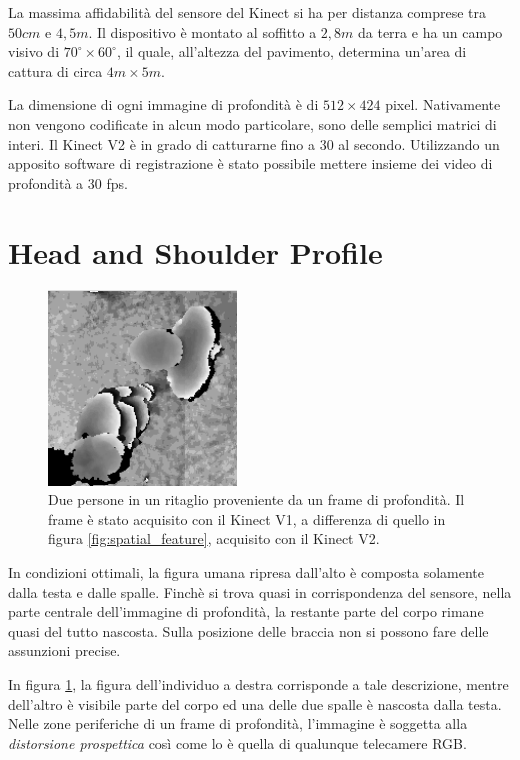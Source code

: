 La massima affidabilità del sensore del Kinect si ha per distanza comprese tra $50cm$ e $4,5m$.
Il dispositivo è montato al soffitto a $2,8m$ da terra e ha un campo visivo di $70^{\circ} \times 60^{\circ}$, il quale, all'altezza del pavimento, determina un'area di cattura di circa $4m \times 5m$.

La dimensione di ogni immagine di profondità è di $512 \times 424$ pixel. Nativamente non vengono codificate in alcun modo particolare, sono delle semplici matrici di interi.
Il Kinect V2 è in grado di catturarne fino a 30 al secondo. Utilizzando un apposito software di registrazione è stato possibile mettere insieme dei video di profondità a 30 fps.

\section{Head and Shoulder Profile}
\label{sec:hasp}

\begin{figure}
    \begin{center}
        \includegraphics[width=5cm]{img/no_occlusion.png}
    \end{center}
    \caption{Due persone in un ritaglio proveniente da un frame di profondità. Il frame è stato acquisito con il Kinect V1, a differenza di quello in figura \ref{fig:spatial_feature}, acquisito con il Kinect V2.}
    \label{fig:no_occlusion}
\end{figure}

In condizioni ottimali, la figura umana ripresa dall'alto è composta solamente dalla testa e dalle spalle.
Finchè si trova quasi in corrispondenza del sensore, nella parte centrale dell'immagine di profondità, la restante parte del corpo rimane quasi del tutto nascosta. Sulla posizione delle braccia non si possono fare delle assunzioni precise.

In figura \ref{fig:no_occlusion}, la figura dell'individuo a destra corrisponde a tale descrizione, mentre dell'altro è visibile parte del corpo ed una delle due spalle è nascosta dalla testa.
Nelle zone periferiche di un frame di profondità, l'immagine è soggetta alla \emph{distorsione prospettica} così come lo è quella di qualunque telecamere RGB.


